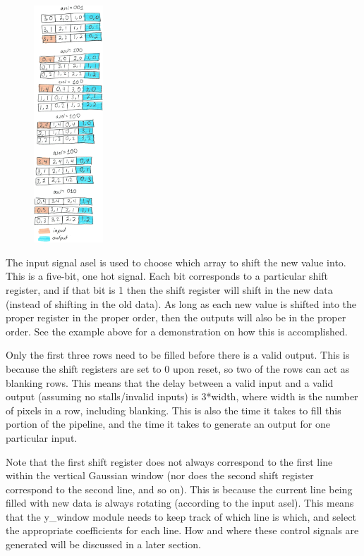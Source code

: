 \documentclass[12pt]{article}
\begin{document}
\begin{figure}
    \includegraphics[width=0.23\textwidth]{processed_image_pngs/io_diagram.png}
\end{figure}


The input signal asel is used to choose which array to shift the new value into. 
This is a five-bit, one hot signal. Each bit corresponds to a particular 
shift register, and if that bit is 1 then the shift register will shift in the 
new data (instead of shifting in the old data). As long as each new value is 
shifted into the proper register in the proper order, then the outputs will also 
be in the proper order. See the example above for a demonstration on how this is 
accomplished.

Only the first three rows need to be filled before there is a valid output. This 
is because the shift registers are set to 0 upon reset, so two of the rows can 
act as blanking rows. This means that the delay between a valid input and 
a valid output (assuming no stalls/invalid inputs) is 3*width, where width is 
the number of pixels in a row, including blanking. This is also the time it 
takes to fill this portion of the pipeline, and the time it takes to generate an 
output for one particular input.

Note that the first shift register does not always correspond to the first line 
within the vertical Gaussian window (nor does the second shift register 
correspond to the second line, and so on). This is because the current line 
being filled with new data is always rotating (according to the input asel). 
This means that the y\_window module needs to keep track of which line is which, 
and select the appropriate coefficients for each line. How and where these 
control signals are generated will be discussed in a later section.
\end{document}
